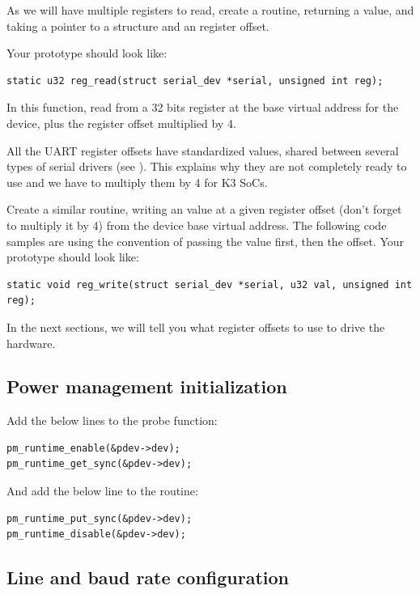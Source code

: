 As we will have multiple registers to read, create a 
routine, returning a  value, and taking a 
pointer to a  structure and an 
register offset.

Your prototype should look like:
\begin{verbatim}
static u32 reg_read(struct serial_dev *serial, unsigned int reg);
\end{verbatim}

In this function, read from a 32 bits register at the base virtual
address for the device, plus the register offset multiplied by 4.

All the UART register offsets have standardized values, shared between
several types of serial drivers (see
). This explains why they are not
completely ready to use and we have to multiply them by 4 for K3 SoCs.

Create a similar  routine, writing an 
value at a given register offset (don't forget to multiply it by 4) from
the device base virtual address. The following code samples are using
the  convention of passing the value first, then the
offset. Your prototype should look like:
\begin{verbatim}
static void reg_write(struct serial_dev *serial, u32 val, unsigned int reg);
\end{verbatim}

In the next sections, we will tell you what register offsets to use
to drive the hardware.

\subsection{Power management initialization}

Add the below lines to the probe function:

\begin{verbatim}
pm_runtime_enable(&pdev->dev);
pm_runtime_get_sync(&pdev->dev);
\end{verbatim}

And add the below line to the  routine:

\begin{verbatim}
pm_runtime_put_sync(&pdev->dev);
pm_runtime_disable(&pdev->dev);
\end{verbatim}

\subsection{Line and baud rate configuration}


